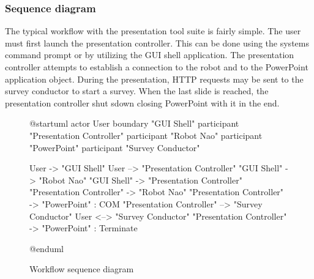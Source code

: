 \documentclass[12pt, fleqn, a4paper]{article}
\begin{document}
\subsubsection{Sequence diagram}
The typical workflow with the presentation tool suite is fairly simple. The user must first launch the presentation controller. This can be done using the systems command prompt or by utilizing the GUI shell application. 
The presentation controller attempts to establish a connection to the robot and to the PowerPoint application object. During the presentation, HTTP requests may be sent to the survey conductor to start a survey. When the last slide is reached, the presentation controller shut sdown closing PowerPoint with it in the end.
\begin{figure}[H]
	\centering
	\begin{plantuml}
@startuml
actor User
boundary "GUI Shell"
participant "Presentation Controller"
participant "Robot Nao"
participant "PowerPoint"
participant "Survey Conductor"


User -> "GUI Shell"
User --> "Presentation Controller"
"GUI Shell" -> "Robot Nao"
"GUI Shell" -> "Presentation Controller"
"Presentation Controller" -> "Robot Nao"
"Presentation Controller" -> "PowerPoint" : COM
"Presentation Controller" --> "Survey Conductor"
User <--> "Survey Conductor"
"Presentation Controller" -> "PowerPoint" : Terminate

@enduml
	\end{plantuml}
	\caption{Workflow sequence diagram}

\end{figure}
\end{document}
